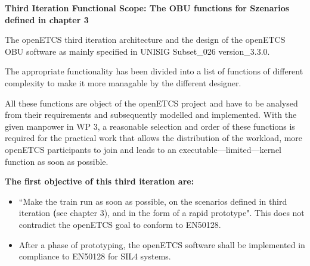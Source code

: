 \textbf{Third Iteration Functional Scope: The OBU functions for Szenarios defined in chapter 3}

The openETCS third iteration architecture and the design of the openETCS OBU software as mainly specified in \cite{subset-026} UNISIG Subset\_026 version\_3.3.0. 

The appropriate functionality has been divided into a list of functions of different complexity to make it more managable by the different designer.

All these functions are object of the openETCS project and have to be analysed from their requirements and subsequently modelled and implemented. With the given manpower in WP 3, a reasonable selection and order of these functions is required for the practical work that allows the distribution of the workload, more openETCS participants to join and leads to an executable---limited---kernel function as soon as possible. 


\textbf{The first objective of this third iteration are:}
\begin{itemize}
\item ``Make the train run as soon as possible, on the scenarios defined in third iteration \textbf(see chapter 3), and in the form of a rapid prototype".
This does not contradict the openETCS goal to conform to EN50128.
\item After a phase of prototyping, the openETCS software shall be implemented in compliance to EN50128 for SIL4 systems.
\end{itemize}


